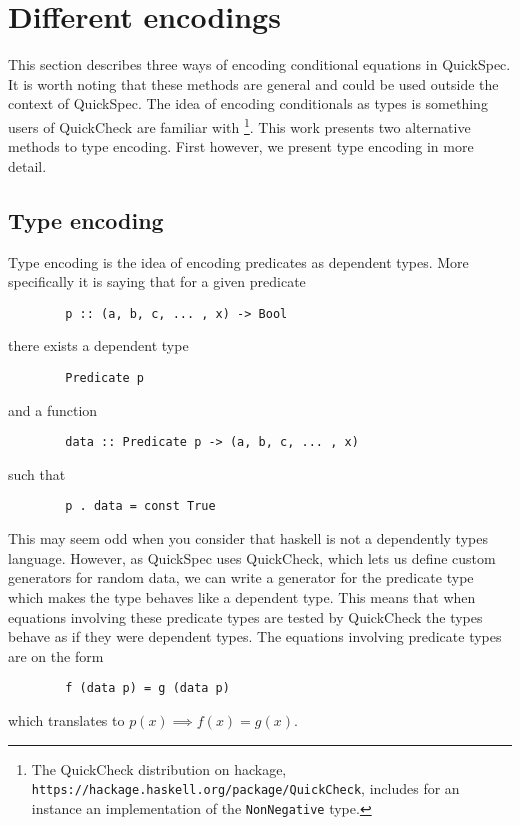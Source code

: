 \section{Different encodings}\label{encodings}

    This section describes three
    ways of encoding conditional
    equations in QuickSpec. It is
    worth noting that these methods
    are general and could be used outside
    the context of QuickSpec. The
    idea of encoding conditionals
    as types is something users of
    QuickCheck \cite{Claessen2000}
    are familiar with
    \footnote{The QuickCheck distribution
    on hackage, \texttt{https://hackage.haskell.org/package/QuickCheck}, includes for an instance an implementation
    of the \texttt{NonNegative} type.}. 
    This work presents two alternative methods
    to type encoding. First however, we present type encoding
    in more detail.

    \subsection{Type encoding}\label{TE}

        Type encoding is the idea of encoding
        predicates as dependent types. More specifically
        it is saying that for a given predicate
        \begin{verbatim}
        p :: (a, b, c, ... , x) -> Bool
        \end{verbatim}
        there exists a dependent type
        \begin{verbatim}
        Predicate p
        \end{verbatim}
        and a function 
        \begin{verbatim}
        data :: Predicate p -> (a, b, c, ... , x)
        \end{verbatim}
        such that 
        \begin{verbatim}
        p . data = const True
        \end{verbatim}
        This may seem odd when you consider that haskell is not a dependently types
        language. However, as QuickSpec uses QuickCheck, which lets us define
        custom generators for random data, we can write a generator for 
        the predicate type which makes the type behaves like a dependent type.
        This means that when equations involving these predicate
        types are tested by QuickCheck the types behave as if they were dependent types.
        The equations involving predicate types are on the form
        \begin{verbatim}
        f (data p) = g (data p)
        \end{verbatim}
        which translates to $p(x) \implies f(x) = g(x)$.

